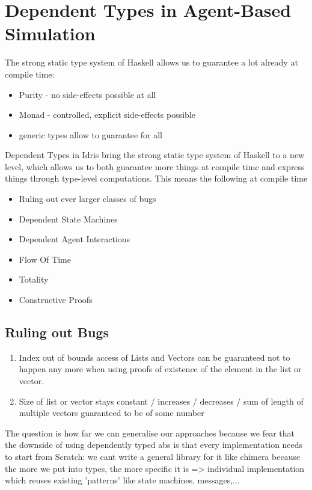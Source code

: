 \section{Dependent Types in Agent-Based Simulation}

The strong static type system of Haskell allows us to guarantee a lot already at compile time:
\begin{itemize}
	\item Purity - no side-effects possible at all 
	\item Monad - controlled, explicit side-effects possible
	\item generic types allow to guarantee for all
\end{itemize}

Dependent Types in Idris bring the strong static type system of Haskell to a new level, which allows us to both guarantee more things at compile time and express things through type-level computations. This means the following at compile time

\begin{itemize}
	\item Ruling out ever larger classes of bugs
	\item Dependent State Machines
	\item Dependent Agent Interactions
	\item Flow Of Time
	\item Totality
	\item Constructive Proofs
\end{itemize}

\subsection{Ruling out Bugs}
\begin{enumerate}
	\item Index out of bounds access of Lists and Vectors can be guaranteed not to happen any more when using proofs of existence of the element in the list or vector.
	\item Size of list or vector stays constant / increases / decreases / sum of length of multiple vectors guaranteed to be of some number
\end{enumerate}

The question is how far we can generalise our approaches because we fear that the downside of using dependently typed abs is that every implementation needs to start from Scratch: we cant write a general library for it like chimera because the more we put into types, the more specific it is => individual implementation which reuses existing 'patterns' like state machines, messages,...


